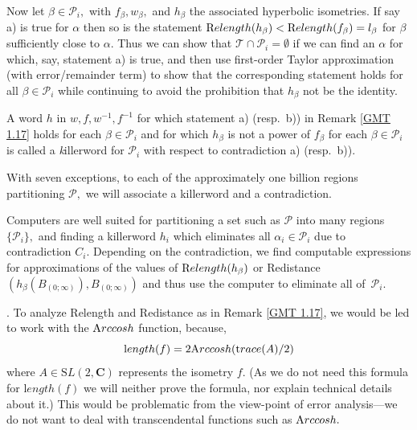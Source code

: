 \begin{remark}
\begin{remark}
Now let $\beta\in {\mathcal P}_i,$
with $f_\beta, w_\beta,$ and $h_\beta$ the associated hyperbolic isometries.  If
say a) is true for $\alpha$
then so is the statement $\Relength(h_\beta) < \Relength(f_\beta)\break = l_\beta$ for
$\beta$ sufficiently close to $\alpha.$
Thus we can show that ${\mathcal T}\cap {\mathcal P}_i =\emptyset$ if we can find an $\alpha$ for
which, say, statement a) is true, and then
use first-order Taylor approximation (with error/remainder term) to show that the corresponding
statement holds for all $\beta\in {\mathcal P}_i $ while continuing to avoid the prohibition that $h_\beta$ not be the identity.
\end{remark}


\begin{definition}  \label{GMT 1.18} A word $h$ in $w,f,w^{-1},f^{-1}$ for which statement a) (resp.\ b)) in
Remark \ref{GMT 1.17}
holds for each $\beta\in {\mathcal P}_i$
and for which $h_\beta$ is not a power of $f_\beta$ for each $\beta\in {\mathcal P}_i$ is
called a {\textit killerword} for ${\mathcal P}_i$ with respect to contradiction a) (resp.\ b)).
\end{definition}

\begin{summary}  \label{GMT 1.19} With seven exceptions,  to each of the approximately one
billion regions partitioning ${\mathcal P},$ we will
associate a killerword and a contradiction.  \end{summary} 

\begin{remark}  \label{GMT 1.20} Computers are well suited for partitioning a set such as ${\mathcal P}$
into many regions $\{{\mathcal P}_i \},$ and finding a
killerword $h_i$ which eliminates all $\alpha_i \in {\mathcal P}_i $ due to contradiction $C_i.$
Depending on the contradiction, we find
computable expressions  for approximations of the values of
${\textrm Relength}(h_\beta)$ or Redistance$(h_\beta(B_{(0;\infty)}), B_{(0;\infty)})$ and
thus use the computer to eliminate all of~${\mathcal P}_i .$ 
\end{remark}

\begin{remark}\label{GMT 1.21}.
	To analyze Relength and Redistance as in Remark \ref{GMT 1.17}, we would be led to work with the ${\textrm Arccosh}$ function, because, 
$${\mathrm length}(f) = 2{\textrm Arccosh}({\mathrm trace}(A)/2)$$
where $A\in {\mathrm SL}(2,{\mathbf C})$ represents the isometry $f.$
(As we do not need this formula for ${\mathrm length}(f)$ we will neither prove the formula, nor explain technical details about it.)  This would be problematic from the view-point of error analysis---we do not want to deal with transcendental functions such as ${\textrm Arccosh}.$  


\end{remark}
\end{remark}
